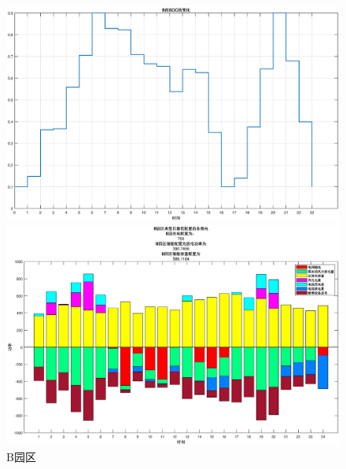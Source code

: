 \documentclass{cumcmthesis}
\begin{document}
     \begin{figure}[!h]  
\centering 
\begin{minipage}{.5\textwidth}  
  \centering  
  \includegraphics[width=.99\linewidth]{figures/Q31_B_SOC.eps}  
\end{minipage}%
\begin{minipage}{.5\textwidth}  
  \centering  
  \includegraphics[width=.99\linewidth]{figures/Q31_B.eps}  
\end{minipage}  
\caption{B园区}  
\end{figure} 
\end{document}

